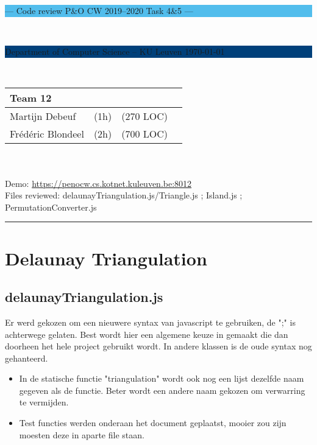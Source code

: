 \documentclass[a4paper,11pt]{article}
\begin{document}
\noindent
\colorbox[HTML]{52BDEC}{\bfseries\parbox{\textwidth}{\centering\large
  --- Code review P\&O CW 2019--2020 Task 4\&5 ---
}}
\\[-1mm]
\colorbox[HTML]{00407A}{\bfseries\color{white}\parbox{\textwidth}{
  Department of Computer Science -- KU Leuven
  \hfill
  \today
}}
\\

\smallskip

\noindent
\begin{tabular}{*4l}
\toprule
\multicolumn{3}{l}{\large\textbf{Team 12}} \\
\midrule
Martijn Debeuf & (1h) & (270 LOC) \\ %
Frédéric Blondeel & (2h) & (700 LOC) \\
\bottomrule
\hline
\end{tabular}\\
\\
Demo: \url{https://penocw.cs.kotnet.kuleuven.be:8012} \\
Files reviewed: delaunayTriangulation.js/Triangle.js ; Island.js ; PermutationConverter.js

\noindent
{\color[HTML]{52BDEC} \rule{\linewidth}{1mm} }

\smallskip

\section{Delaunay Triangulation}
\subsection{delaunayTriangulation.js}
Er werd gekozen om een nieuwere syntax van javascript te gebruiken, de ";" is achterwege gelaten. 
Best wordt hier een algemene keuze in gemaakt die dan doorheen het hele project gebruikt wordt. In andere klassen 
is de oude syntax nog gehanteerd.
\begin{itemize}
\item In de statische functie "triangulation" wordt ook nog een lijst dezelfde naam gegeven als de functie. Beter wordt een andere naam gekozen om verwarring te vermijden.
\item Test functies werden onderaan het document geplaatst, mooier zou zijn moesten deze in aparte file staan.
\end{itemize}
\end{document}
